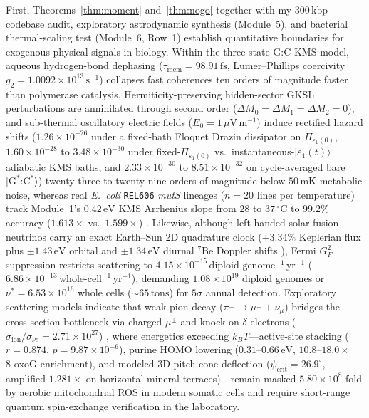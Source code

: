 \documentclass[10pt,letterpaper]{article}
\theoremstyle{plain}
\theoremstyle{definition}
\newcommand{\oxog}{\text{8-oxoG}}
\begin{document}
First, Theorems~\ref{thm:moment} and~\ref{thm:nogo} together with my $300\,\mathrm{kbp}$ codebase audit, exploratory astrodynamic synthesis (Module~5), and bacterial thermal-scaling test (Module~6, Row~1) establish quantitative boundaries for exogenous physical signals in biology. Within the three-state G:C KMS model, aqueous hydrogen-bond dephasing ($\tau_{\mathrm{mem}} = 98.91\,\mathrm{fs}$, Lumer--Phillips coercivity $g_2 = 1.0092 \times 10^{13}\,\mathrm{s}^{-1}$) collapses fast coherences ten orders of magnitude faster than polymerase catalysis, Hermiticity-preserving hidden-sector GKSL perturbations are annihilated through second order ($\Delta M_0 = \Delta M_1 = \Delta M_2 = 0$), and sub-thermal oscillatory electric fields ($E_0 = 1\,\mu\mathrm{V\,m^{-1}}$) induce rectified hazard shifts ($1.26 \times 10^{-26}$ under a fixed-bath Floquet Drazin dissipator on $\Pi_{\varepsilon_1(0)}$, $1.60 \times 10^{-28}$ to $3.48 \times 10^{-30}$ under fixed-$\Pi_{\varepsilon_1(0)}$ vs.\ instantaneous-$|\varepsilon_1(t)\rangle$ adiabatic KMS baths, and $2.33 \times 10^{-30}$ to $8.51 \times 10^{-32}$ on cycle-averaged bare $|\mathrm{G}^*\text{:}\mathrm{C}^*\rangle$) twenty-three to twenty-nine orders of magnitude below $50\,\mathrm{mK}$ metabolic noise, whereas real \emph{E.\ coli} \texttt{REL606} \emph{mutS} lineages ($n = 20$ lines per temperature) track Module~1's $0.42\,\mathrm{eV}$ KMS Arrhenius slope from $28$ to $37\,^\circ\mathrm{C}$ to $99.2\%$ accuracy ($1.613\times$ vs.\ $1.599\times$) \cite{chu2018bmcevol}. Likewise, although left-handed solar fusion neutrinos carry an exact Earth--Sun 2D quadrature clock ($\pm 3.34\%$ Keplerian flux plus $\pm 1.43\,\mathrm{eV}$ orbital and $\pm 1.34\,\mathrm{eV}$ diurnal $^7\mathrm{Be}$ Doppler shifts \cite{appel2022borexino}), Fermi $G_F^2$ suppression restricts scattering to $4.15 \times 10^{-15}\,\mathrm{diploid\text{-}genome^{-1}\,yr^{-1}}$ ($6.86 \times 10^{-13}\,\mathrm{whole\text{-}cell^{-1}\,yr^{-1}}$), demanding $1.08 \times 10^{19}$ diploid genomes or $\nu^* = 6.53 \times 10^{16}$ whole cells ($\sim 65\,\mathrm{tons}$) for $5\sigma$ annual detection. Exploratory scattering models indicate that weak pion decay ($\pi^\pm \to \mu^\pm + \nu_\mu$) bridges the cross-section bottleneck via charged $\mu^\pm$ and knock-on $\delta$-electrons ($\sigma_{\mathrm{ion}}/\sigma_{\nu e} = 2.71 \times 10^{27}$) \cite{globus2020apjl,globus2021apj,ozturk2022pnas}, where energetics exceeding $k_B T$---active-site stacking ($r = 0.874$, $p = 9.87 \times 10^{-6}$), purine HOMO lowering ($0.31$--$0.66\,\mathrm{eV}$, $10.8$--$18.0\times$ $\oxog$ enrichment), and modeled 3D pitch-cone deflection ($\psi_{\mathrm{crit}} = 26.9^\circ$, amplified $1.281\times$ on horizontal mineral terraces)---remain masked $5.80 \times 10^8$-fold by aerobic mitochondrial ROS in modern somatic cells and require short-range quantum spin-exchange verification in the laboratory.
\end{document}
